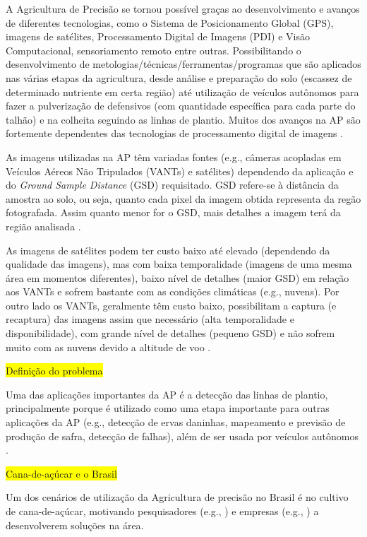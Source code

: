 \documentclass[12pt, a4paper, english, brazil]{article}
\newcommand{\boxYellow}[1]{\colorbox{yellow}{#1}}
\begin{document}
A Agricultura de Precisão se tornou possível graças ao desenvolvimento e avanços de diferentes tecnologias, como o Sistema de Posicionamento Global (GPS), imagens de satélites, Processamento Digital de Imagens (PDI) e Visão Computacional, sensoriamento remoto entre outras. Possibilitando o desenvolvimento de metologias/técnicas/ferramentas/programas que são aplicados nas várias etapas da agricultura, desde análise e preparação do solo (escassez de determinado nutriente em certa região) até utilização de veículos autônomos para fazer a pulverização de defensivos (com quantidade específica para cada parte do talhão) e na colheita seguindo as linhas de plantio. Muitos dos avanços na AP são fortemente dependentes das tecnologias de processamento digital de imagens \cite{Bolfe_2020}.

As imagens utilizadas na AP têm variadas fontes (e.g., câmeras acopladas em Veículos Aéreos Não Tripulados (VANTs) e satélites) dependendo da aplicação e do \textit{Ground Sample Distance} (GSD) requisitado. GSD refere-se à distância da amostra ao solo, ou seja, quanto cada pixel da imagem obtida representa da regão fotografada. Assim quanto menor for o GSD, mais detalhes a imagem terá da região analisada \cite{Messina_2020}.

As imagens de satélites podem ter custo baixo até elevado (dependendo da qualidade das imagens), mas com baixa temporalidade (imagens de uma mesma área em momentos diferentes), baixo nível de detalhes (maior GSD) em relação aos VANTs e sofrem bastante com as condições climáticas (e.g., nuvens). Por outro lado os VANTs, geralmente têm custo baixo, possibilitam a captura (e recaptura) das imagens assim que necessário (alta temporalidade e disponibilidade), com grande nível de detalhes (pequeno GSD) e não sofrem muito com as nuvens devido a altitude de voo \cite{Candiago_2015, Delavarpour_2021}.

\boxYellow{Definição do problema}

Uma das aplicações importantes da AP é a detecção das linhas de plantio, principalmente porque é utilizado como uma etapa importante para outras aplicações da AP (e.g., detecção de ervas daninhas, mapeamento e previsão de produção de safra, detecção de falhas), além de ser usada por veículos autônomos
\cite{Hassanein_2019}.

\boxYellow{Cana-de-açúcar e o Brasil}

Um dos cenários de utilização da Agricultura de precisão no Brasil é no cultivo de cana-de-açúcar, motivando pesquisadores (e.g., ) e empresas (e.g., ) a desenvolverem soluções na área.
\end{document}
